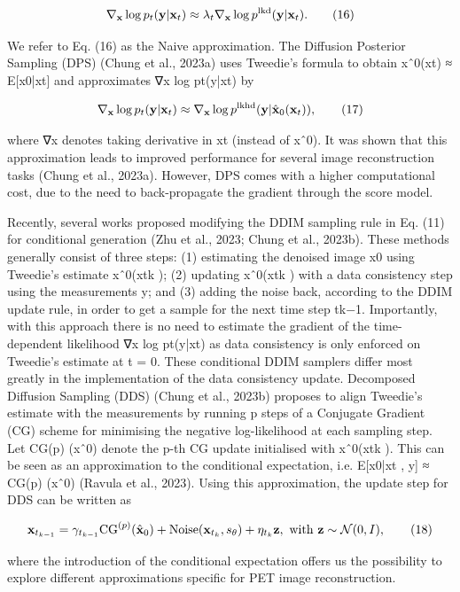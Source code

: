 \documentclass{article}
\begin{document}
$$\nabla_{\bf x}\log p_{t}({\bf y}|{\bf x}_{t})\approx\lambda_{t}\nabla_{\bf x}\log p^{\rm lkd}({\bf y}|{\bf x}_{t}).\tag{16}$$

We refer to Eq. (16) as the Naive approximation. The Diffusion Posterior Sampling (DPS) (Chung et al., 2023a) uses Tweedie's formula to obtain xˆ0(xt) ≈ E[x0|xt] and approximates ∇x log pt(y|xt) by

$$\nabla_{\bf x}\log p_{t}({\bf y}|{\bf x}_{t})\approx\nabla_{\bf x}\log p^{\rm lkhd}({\bf y}|\hat{\bf x}_{0}({\bf x}_{t})),\tag{17}$$

where ∇x denotes taking derivative in xt (instead of xˆ0). It was shown that this approximation leads to improved performance for several image reconstruction tasks (Chung et al., 2023a). However, DPS comes with a higher computational cost, due to the need to back-propagate the gradient through the score model.

Recently, several works proposed modifying the DDIM sampling rule in Eq. (11) for conditional generation (Zhu et al., 2023; Chung et al., 2023b). These methods generally consist of three steps: (1) estimating the denoised image x0 using Tweedie's estimate xˆ0(xtk ); (2) updating xˆ0(xtk ) with a data consistency step using the measurements y; and (3) adding the noise back, according to the DDIM update rule, in order to get a sample for the next time step tk−1. Importantly, with this approach there is no need to estimate the gradient of the time-dependent likelihood ∇x log pt(y|xt) as data consistency is only enforced on Tweedie's estimate at t = 0. These conditional DDIM samplers differ most greatly in the implementation of the data consistency update. Decomposed Diffusion Sampling (DDS) (Chung et al., 2023b) proposes to align Tweedie's estimate with the measurements by running p steps of a Conjugate Gradient (CG) scheme for minimising the negative log-likelihood at each sampling step. Let CG(p) (xˆ0) denote the p-th CG update initialised with xˆ0(xtk ). This can be seen as an approximation to the conditional expectation, i.e. E[x0|xt , y] ≈ CG(p) (xˆ0) (Ravula et al., 2023). Using this approximation, the update step for DDS can be written as

$${\bf x}_{t_{k-1}}=\gamma_{t_{k-1}}{\rm CG}^{(p)}(\hat{\bf x}_{0})+{\rm Noise}({\bf x}_{t_{k}},s_{\theta})+\eta_{t_{k}}{\bf z},\ {\rm with}\ {\bf z}\sim{\cal N}(0,I),\tag{18}$$

where the introduction of the conditional expectation offers us the possibility to explore different approximations specific for PET image reconstruction.
\end{document}
